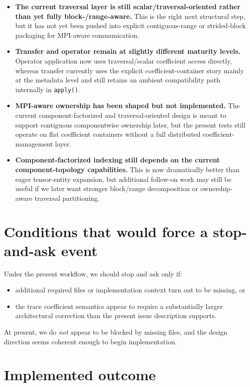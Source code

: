 \documentclass[11pt]{article}
\begin{document}
\begin{itemize}[leftmargin=2em]
\item \textbf{The current traversal layer is still scalar/traversal-oriented rather than yet fully block-/range-aware.} This is the right next structural step, but it has not yet been pushed into explicit contiguous-range or strided-block packaging for MPI-aware communication.
\item \textbf{Transfer and operator remain at slightly different maturity levels.} Operator application now uses traversal/scalar coefficient access directly, whereas transfer currently uses the explicit coefficient-container story mainly at the metadata level and still retains an ambient compatibility path internally in \texttt{apply()}.
\item \textbf{MPI-aware ownership has been shaped but not implemented.} The current component-factorized and traversal-oriented design is meant to support contiguous componentwise ownership later, but the present tests still operate on flat coefficient containers without a full distributed coefficient-management layer.
\item \textbf{Component-factorized indexing still depends on the current component-topology capabilities.} This is now dramatically better than eager tensor-entity expansion, but additional follow-on work may still be useful if we later want stronger block/range decomposition or ownership-aware traversal partitioning.
\end{itemize}

\section{Conditions that would force a stop-and-ask event}

Under the present workflow, we should stop and ask only if:
\begin{itemize}[leftmargin=2em]
\item additional required files or implementation context turn out to be missing, or
\item the trace coefficient semantics appear to require a substantially larger architectural correction than the present issue description supports.
\end{itemize}

At present, we do \emph{not} appear to be blocked by missing files, and the design direction seems coherent enough to begin implementation.

\section{Implemented outcome}
\end{document}
